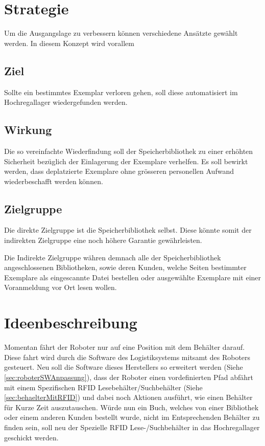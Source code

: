 \chapter{Strategie}
Um die Ausgangslage zu verbessern können verschiedene Ansätzte gewählt werden. In diesem Konzept wird vorallem

\section{Ziel}
Sollte ein bestimmtes Exemplar verloren gehen, soll diese automatisiert im Hochregallager wiedergefunden werden.

\section{Wirkung}
Die so vereinfachte Wiederfindung soll der Speicherbibliothek zu einer erhöhten Sicherheit bezüglich der Einlagerung der Exemplare verhelfen. Es soll bewirkt werden, dass deplatzierte Exemplare ohne grösseren personellen Aufwand wiederbeschafft werden können.

\section{Zielgruppe}
Die direkte Zielgruppe ist die Speicherbibliothek selbst. Diese könnte somit der indirekten Zielgruppe eine noch höhere Garantie gewährleisten.

Die Indirekte Zielgruppe währen demnach alle der Speicherbibliothek angeschlossenen Bibliotheken, sowie deren Kunden, welche Seiten bestimmter Exemplare als eingescannte Datei bestellen oder ausgewählte Exemplare mit einer Voranmeldung vor Ort lesen wollen.

\chapter{Ideenbeschreibung}
Momentan fährt der Roboter nur auf eine Position mit dem Behälter darauf. Diese fahrt wird durch die Software des Logistiksystems mitsamt des Roboters gesteuert. Neu soll die Software dieses Herstellers so erweitert werden (Siehe \ref{sec:roboterSWAnpassung}), dass der Roboter einen vordefinierten Pfad abfährt mit einem Spezifischen RFID Lesebehälter/Suchbehälter (Siehe \ref{sec:behaelterMitRFID}) und dabei noch Aktionen ausführt, wie einen Behälter für Kurze Zeit auszutauschen.
Würde nun ein Buch, welches von einer Bibliothek oder einem anderen Kunden bestellt wurde, nicht im Entsprechenden Behälter zu finden sein, soll neu der Spezielle RFID Lese-/Suchbehälter in das Hochregallager geschickt werden.



